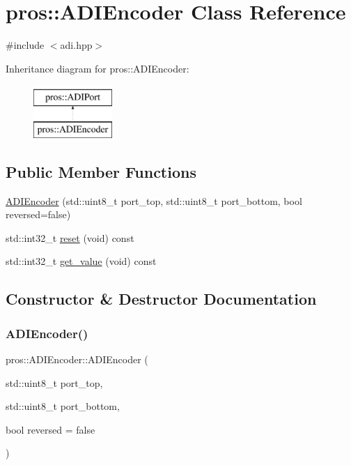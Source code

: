 \hypertarget{classpros_1_1ADIEncoder}{}\section{pros\+:\+:A\+D\+I\+Encoder Class Reference}
\label{classpros_1_1ADIEncoder}


{\ttfamily \#include $<$adi.\+hpp$>$}

Inheritance diagram for pros\+:\+:A\+D\+I\+Encoder\+:\begin{figure}[H]
\begin{center}
\leavevmode
\includegraphics[height=2.000000cm]{classpros_1_1ADIEncoder}
\end{center}
\end{figure}
\subsection*{Public Member Functions}
\begin{DoxyCompactItemize}
\item 
\hyperlink{classpros_1_1ADIEncoder_a927287940aedad3ea67f292908c623f7}{A\+D\+I\+Encoder} (std\+::uint8\+\_\+t port\+\_\+top, std\+::uint8\+\_\+t port\+\_\+bottom, bool reversed=false)
\item 
std\+::int32\+\_\+t \hyperlink{classpros_1_1ADIEncoder_a38a555946a841150b203f940b4b44cc8}{reset} (void) const
\item 
std\+::int32\+\_\+t \hyperlink{classpros_1_1ADIEncoder_acb4c087c7318028db25ae39dabb64700}{get\+\_\+value} (void) const
\end{DoxyCompactItemize}


\subsection{Constructor \& Destructor Documentation}
\mbox{\label{classpros_1_1ADIEncoder_a927287940aedad3ea67f292908c623f7}} 
\subsubsection{\texorpdfstring{A\+D\+I\+Encoder()}{ADIEncoder()}}
{\footnotesize\ttfamily pros\+::\+A\+D\+I\+Encoder\+::\+A\+D\+I\+Encoder (\begin{DoxyParamCaption}\item[{std\+::uint8\+\_\+t}]{port\+\_\+top,  }\item[{std\+::uint8\+\_\+t}]{port\+\_\+bottom,  }\item[{bool}]{reversed = {\ttfamily false} }\end{DoxyParamCaption})}

